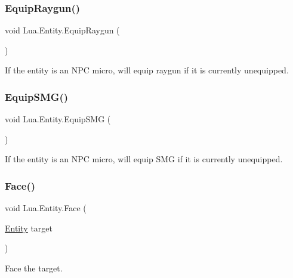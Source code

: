\subsubsection{\texorpdfstring{EquipRaygun()}{EquipRaygun()}}
{\footnotesize\ttfamily void Lua.\+Entity.\+Equip\+Raygun (\begin{DoxyParamCaption}{ }\end{DoxyParamCaption})}



If the entity is an N\+PC micro, will equip raygun if it is currently unequipped. 

\mbox{\label{class_lua_1_1_entity_aaa24b31446f5c0087faa4030f91e80ac}} 
\subsubsection{\texorpdfstring{EquipSMG()}{EquipSMG()}}
{\footnotesize\ttfamily void Lua.\+Entity.\+Equip\+S\+MG (\begin{DoxyParamCaption}{ }\end{DoxyParamCaption})}



If the entity is an N\+PC micro, will equip S\+MG if it is currently unequipped. 

\mbox{\label{class_lua_1_1_entity_a442bfc9dcbb33b4fa3922a59357a8723}} 
\subsubsection{\texorpdfstring{Face()}{Face()}}
{\footnotesize\ttfamily void Lua.\+Entity.\+Face (\begin{DoxyParamCaption}\item[{\mbox{\hyperlink{class_lua_1_1_entity}{Entity}}}]{target }\end{DoxyParamCaption})}



Face the target. 

\mbox{\label{class_lua_1_1_entity_ac7eac4ebcb1fe784ab5c06eed7885cf7}} 
